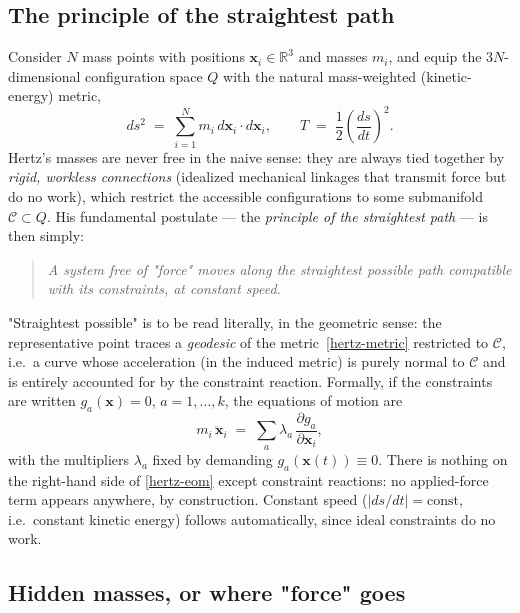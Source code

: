 \subsection{The principle of the straightest path}

Consider $N$ mass points with positions $\mathbf x_i\in\mathbb R^3$
and masses $m_i$, and equip the $3N$-dimensional configuration space
$Q$ with the natural mass-weighted (kinetic-energy) metric,
\begin{equation}
  ds^2 \;=\; \sum_{i=1}^N m_i\, d\mathbf x_i\cdot d\mathbf x_i,
  \qquad
  T \;=\; \frac12\left(\frac{ds}{dt}\right)^{\!2}.
  \label{hertz-metric}
\end{equation}
Hertz's masses are never free in the naive sense: they are always
tied together by \emph{rigid, workless connections} (idealized
mechanical linkages that transmit force but do no work), which
restrict the accessible configurations to some submanifold
$\mathcal C\subset Q$. His fundamental postulate --- the
\emph{principle of the straightest path}
--- is then simply:

\begin{quote}
\emph{A system free of "force" moves along the straightest possible
path compatible with its constraints, at constant speed.}
\end{quote}

"Straightest possible" is to be read literally, in the geometric
sense: the representative point traces a \emph{geodesic} of the
metric~\eqref{hertz-metric} restricted to $\mathcal C$, i.e.\ a
curve whose acceleration (in the induced metric) is purely normal to
$\mathcal C$ and is entirely accounted for by the constraint
reaction. Formally, if the constraints are written $g_a(\mathbf
x)=0$, $a=1,\dots,k$, the equations of motion are
\begin{equation}
  m_i\,\ddot{\mathbf x}_i \;=\; \sum_a \lambda_a\,
  \frac{\partial g_a}{\partial \mathbf x_i},
  \label{hertz-eom}
\end{equation}
with the multipliers $\lambda_a$ fixed by demanding $g_a(\mathbf
x(t))\equiv 0$. There is nothing on the right-hand side of
\eqref{hertz-eom} except constraint reactions: no applied-force
term appears anywhere, by construction. Constant speed
($|ds/dt|=\mathrm{const}$, i.e.\ constant kinetic energy) follows
automatically, since ideal constraints do no work.

\subsection{Hidden masses, or where "force" goes}

